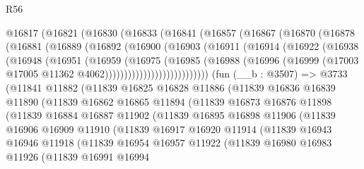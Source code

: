 \begin{lexlean}{R56}
\begin{coremodule}
    @16817
      (@16821
        (@16830
          (@16833
            (@16841
              (@16857
                (@16867
                  (@16870
                    (@16878
                      (@16881
                        (@16889
                          (@16892
                            (@16900
                              (@16903
                                (@16911
                                  (@16914
                                    (@16922
                                      (@16938
                                        (@16948
                                          (@16951
                                            (@16959
                                              (@16975
                                                (@16985
                                                  (@16988
                                                    (@16996
                                                      (@16999
                                                        (@17003
                                                          @17005
                                                          @11362
                                                          @4062)))))))))))))))))))))))))))
    (fun (__b : @3507) =>
    @3733
      (@11841
        @11882
        (@11839
          @16825
          @16828
          @11886
          (@11839
            @16836
            @16839
            @11890
            (@11839
              @16862
              @16865
              @11894
              (@11839
                @16873
                @16876
                @11898
                (@11839
                  @16884
                  @16887
                  @11902
                  (@11839
                    @16895
                    @16898
                    @11906
                    (@11839
                      @16906
                      @16909
                      @11910
                      (@11839
                        @16917
                        @16920
                        @11914
                        (@11839
                          @16943
                          @16946
                          @11918
                          (@11839
                            @16954
                            @16957
                            @11922
                            (@11839
                              @16980
                              @16983
                              @11926
                              (@11839
                                @16991
                                @16994

\end{coremodule}
\end{lexlean}
